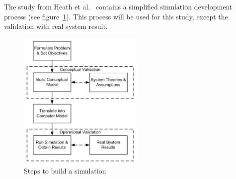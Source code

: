 The study from Heath et al.~\cite{heath2009survey} contains a simplified simulation development process (see figure~\ref{fig:steps_simulation}).
This process will be used for this study, except the validation with real system result.

\begin{figure}
    \centering
    \includegraphics[width=6cm]{sections/pics/Steps_To_Build_Simulation}
    \caption{Steps to build a simulation}
    \label{fig:steps_simulation}
\end{figure}










